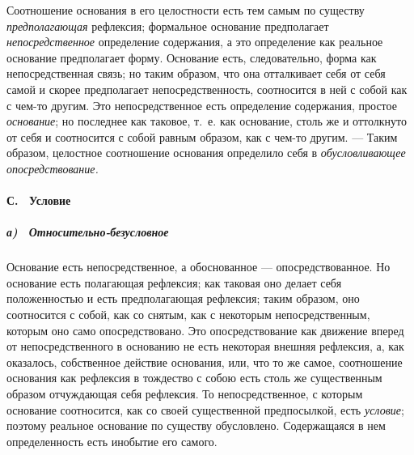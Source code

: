 Соотношение основания в его целостности есть тем самым по существу
{\em предполагающая} рефлексия; формальное основание
предполагает {\em непосредственное} определение
содержания, а это определение как реальное основание предполагает форму.
Основание есть, следовательно, форма как непосредственная связь; но таким
образом, что она отталкивает себя от себя самой и скорее предполагает
непосредственность, соотносится в ней с собой как с чем-то другим. Это
непосредственное есть определение содержания, простое
{\em основание}; но последнее как таковое, т.~е. как
основание, столь же и оттолкнуто от себя и соотносится с собой равным
образом, как с чем-то другим. — Таким образом, целостное соотношение
основания определило себя в {\em обусловливающее
опосредствование.}

\paragraph[С. \ Условие]{С. \ Условие}
\subparagraph[а)
\ Относительно{}-безусловное]{а) \ Относительно-безусловное}
Основание есть непосредственное, а обоснованное
— опосредствованное. Но основание есть полагающая рефлексия; как таковая
оно делает себя положенностью и есть предполагающая рефлексия; таким
образом, оно соотносится с собой, как со снятым, как с некоторым
непосредственным, которым оно само опосредствовано. Это опосредствование
как движение вперед от непосредственного в основанию не есть некоторая
внешняя рефлексия, а, как оказалось, собственное действие основания, или,
что то же самое, соотношение основания как рефлексия в тождество с собою
есть столь же существенным образом отчуждающая себя рефлексия. То
непосредственное, с которым основание соотносится, как со своей
существенной предпосылкой, есть {\em условие}; поэтому
реальное основание по существу обусловлено. Содержащаяся в нем
определенность есть инобытие его самого.

